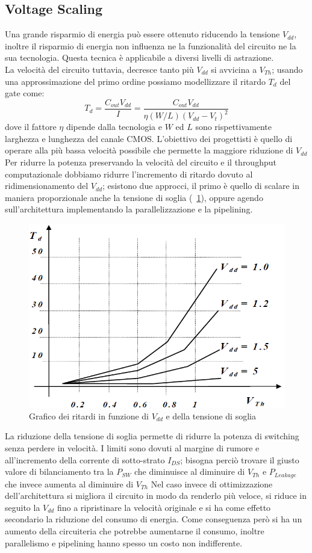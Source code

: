 \subsection{Voltage Scaling}
Una grande risparmio di energia può essere ottenuto riducendo la tensione $V_{dd}$, inoltre il risparmio di energia non influenza ne la funzionalità del circuito ne la sua tecnologia. Questa tecnica è applicabile a diversi livelli di astrazione.\\
La velocità del circuito tuttavia, decresce tanto più $V_{dd}$ si avvicina a $V_{Th}$; usando una approssimazione del primo ordine possiamo modellizzare il ritardo $T_d$ del gate come:
$$T_d = \frac{C_{out}V_{dd}}{I}=\frac{C_{out}V_{dd}}{\eta(W/L)(V_{dd}-V_t)^2}$$
dove il fattore $\eta$ dipende dalla tecnologia e $W$ ed $L$ sono rispettivamente larghezza e lunghezza del canale CMOS.
L'obiettivo dei progettisti è quello di operare alla più bassa velocità possibile che permette la maggiore riduzione di $V_{dd}$
Per ridurre la potenza preservando la velocità del circuito e il throughput computazionale dobbiamo ridurre l'incremento di ritardo dovuto al ridimensionamento del $V_{dd}$; esistono due approcci, il primo è quello di scalare in maniera proporzionale anche la tensione di soglia (\figurename\, \ref{fig:thvdd}), oppure agendo sull'architettura implementando la parallelizzazione e la pipelining.
\begin{figure}[hbt]
\centering
\includegraphics[scale=0.5]{img/thvdd.png}
\caption{Grafico dei ritardi in funzione di $V_{dd}$ e della tensione di soglia}\label{fig:thvdd}
\end{figure}
La riduzione della tensione di soglia permette di ridurre la potenza di switching senza perdere in velocità. I limiti sono dovuti al margine di rumore e all'incremento della corrente di sotto-strato $I_{DS}$; bisogna perciò trovare il giusto valore di bilanciamento tra la $P_{SW}$ che diminuisce al diminuire di $V_{Th}$ e $P_{Leakage}$ che invece aumenta al diminuire di $V_{Th}$
Nel caso invece di ottimizzazione dell'architettura si migliora il circuito in modo da renderlo più veloce, si riduce in seguito la $V_{dd}$ fino a ripristinare la velocità originale e si ha come effetto secondario la riduzione del consumo di energia. Come conseguenza però si ha un aumento della circuiteria che potrebbe aumentarne il consumo, inoltre parallelismo e pipelining hanno spesso un costo non indifferente.
